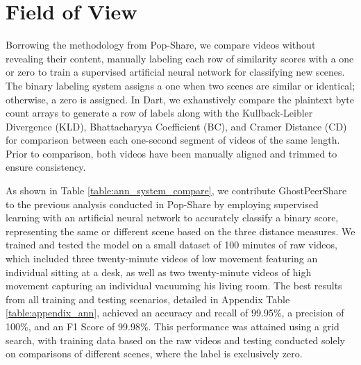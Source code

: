 \section{Field of View}
Borrowing the methodology from Pop-Share, we compare videos without revealing their content, manually labeling each row of similarity scores with a one or zero to train a supervised artificial neural network for classifying new scenes. The binary labeling system assigns a one when two scenes are similar or identical; otherwise, a zero is assigned. In Dart, we exhaustively compare the plaintext byte count arrays to generate a row of labels along with the Kullback-Leibler Divergence (KLD), Bhattacharyya Coefficient (BC), and Cramer Distance (CD) for comparison between each one-second segment of videos of the same length. Prior to comparison, both videos have been manually aligned and trimmed to ensure consistency.



As shown in Table \ref{table:ann_system_compare}, we contribute GhostPeerShare to the previous analysis conducted in Pop-Share by employing supervised learning with an artificial neural network to accurately classify a binary score, representing the same or different scene based on the three distance measures. We trained and tested the model on a small dataset of 100 minutes of raw videos, which included three twenty-minute videos of low movement featuring an individual sitting at a desk, as well as two twenty-minute videos of high movement capturing an individual vacuuming his living room. The best results from all training and testing scenarios, detailed in Appendix Table \ref{table:appendix_ann}, achieved an accuracy and recall of 99.95\%, a precision of 100\%, and an F1 Score of 99.98\%. This performance was attained using a grid search, with training data based on the raw videos and testing conducted solely on comparisons of different scenes, where the label is exclusively zero.
